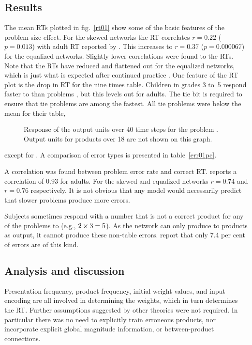 \subsection*{Results}
The mean RTs plotted in fig.~\ref{rt01} show some of the basic features of
the problem-size effect.  For the skewed networks the RT correlates
$r=0.22$ ($p=0.013$) with adult RT reported by . This
increases to $r=0.37$ ($p=0.000067$) for the equalized networks. Slightly
lower correlations were found to the  RTs. Note that the
RTs have reduced and
flattened out for the equalized networks, which is
just what is expected after continued practice
\cite[p.~349]{camp85}. One
feature of the RT plot is the drop in RT for the nine times table. Children
in grades 3 to~5 respond faster to  than  problems \cite{camp85}, but
this levels out for adults.  The tie bit is required to ensure
that tie
problems are among the fastest. All tie problems were below the mean for
their table,%
\begin{wrapfigure}[32]{r}{7.1cm}\fboxsep=2pt
\noindent{}
\caption{Response of the output units over 40 time steps for the problem
.  Output units for products over 18 are not shown on this
graph.}
\label{act01plot}
\end{wrapfigure}
except for . A comparison of error types is presented in
table~\ref{err01pc}.

A correlation was found between problem error rate and correct RT.
 reports a correlation of 0.93 for adults.  For the
skewed and equalized networks $r=0.74$ and $r=0.76$ respectively.  It is
not obvious that any model would necessarily predict that slower problems
produce more errors.

Subjects sometimes respond with a number that is not a correct
product for any of the problems  to  (e.g., $\mbox{$2\times3$}=5$). As the
network can only produce  to  products as output, it cannot produce
these non-table errors.   report that only 7.4 per cent of
errors are of this kind.

\subsection*{Analysis and discussion}

Presentation frequency, product frequency, initial weight values, and input
encoding are all involved in determining the weights, which in turn
determines the RT.  Further assumptions suggested by other theories
\cite{siegmult,camp85} were not required. In particular there was no need
to explicitly train erroneous products, nor incorporate explicit global
magnitude information, or between-product connections.

